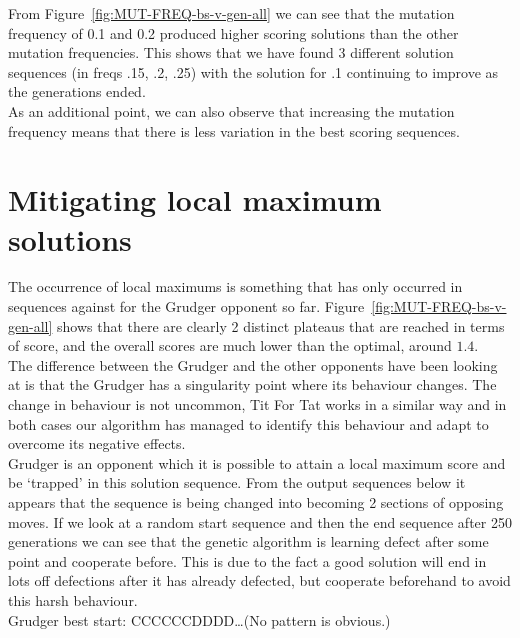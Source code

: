 From Figure~\ref{fig:MUT-FREQ-bs-v-gen-all} we can see that the mutation frequency of 0.1 and 0.2 produced higher scoring solutions than the other mutation frequencies.
This shows that we have found 3 different solution sequences (in freqs .15, .2, .25) with the solution for .1 continuing to improve as the generations ended.\\

As an additional point, we can also observe that increasing the mutation frequency means that there is less variation in the best scoring sequences.

\section{Mitigating local maximum solutions}\label{sec:mitigatingLocalMaximums}
The occurrence of local maximums is something that has only occurred in sequences against for the Grudger opponent so far.
Figure~\ref{fig:MUT-FREQ-bs-v-gen-all} shows that there are clearly 2 distinct plateaus that are reached in terms of score, and the overall scores are much lower than the optimal, around \(1.4\). \\

The difference between the Grudger and the other opponents have been looking at is that the Grudger has a singularity point where its behaviour changes.
The change in behaviour is not uncommon, Tit For Tat works in a similar way and in both cases our algorithm has managed to identify this behaviour and adapt to overcome its negative effects.\\

Grudger is an opponent which it is possible to attain a local maximum score and be `trapped' in this solution sequence.
From the output sequences below it appears that the sequence is being changed into becoming 2 sections of opposing moves.
If we look at a random start sequence and then the end sequence after 250 generations we can see that the genetic algorithm is learning defect after some point and cooperate before.
This is due to the fact a good solution will end in lots off defections after it has already defected, but cooperate beforehand to avoid this harsh behaviour.\\

Grudger best start: CCCCCCDDDD\ldots (No pattern is obvious.)

